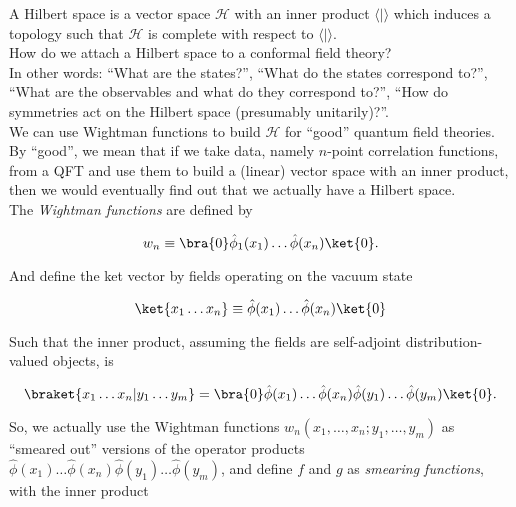 
\noindent A Hilbert space is a vector space $\mathcal{H}$ with an inner product $\langle | \rangle$ which induces a topology such that $\mathcal{H}$ is complete with respect to $\langle | \rangle$. \\

\noindent How do we attach a Hilbert space to a conformal field theory? \\

\noindent In other words: ``What are the states?'', ``What do the states correspond to?'', ``What are the observables and what do they correspond to?'', ``How do symmetries act on the Hilbert space (presumably unitarily)?''. \\

\noindent We can use Wightman functions to build $\mathcal{H}$ for ``good'' quantum field theories. By ``good'', we mean that if we take data, namely $n$-point correlation functions, from a QFT and use them to build a (linear) vector space with an inner product, then we would eventually find out that we actually have a Hilbert space. \\

\noindent The \textit{Wightman functions} are defined by

\begin{equation}
w_n \equiv \bra{0} \hat{\phi}_1 (x_1) \dots \hat{\phi} (x_n) \ket{0}.
\end{equation}

\noindent And define the ket vector by fields operating on the vacuum state

\begin{equation}
\ket{x_1 \dots x_n} \equiv \hat{\phi} (x_1) \dots \hat{\phi} (x_n) \ket{0}
\end{equation}

\noindent Such that the inner product, assuming the fields are self-adjoint distribution-valued objects, is

\begin{equation}
\braket{x_1 \dots x_n | y_1 \dots y_m } = \bra{0} \hat{\phi} (x_1) \dots \hat{\phi} (x_n)  \hat{\phi} (y_1) \dots \hat{\phi} (y_m) \ket{0}.
\end{equation}

\noindent So, we actually use the Wightman functions $w_n (x_1, \dots, x_n ; y_1, \dots, y_m)$ as ``smeared out'' versions of the operator products $\hat{\phi} (x_1) \dots \hat{\phi} (x_n)  \hat{\phi} (y_1) \dots \hat{\phi} (y_m)$, and define $f$ and $g$ as \textit{smearing functions}, with the inner product

